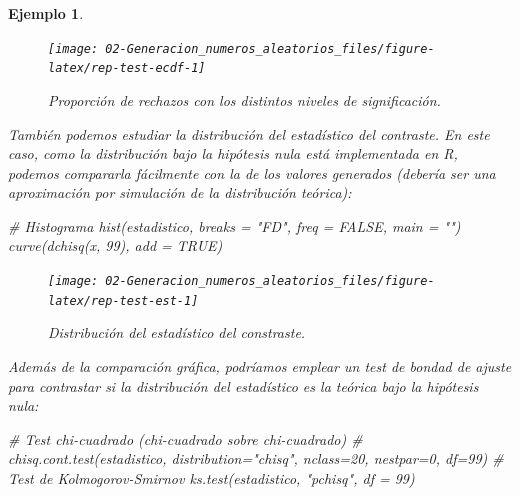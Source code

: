 \documentclass[
]{book}
\newenvironment{Shaded}{\begin{snugshade}}{\end{snugshade}}
\newcommand{\AttributeTok}[1]{\textcolor[rgb]{0.77,0.63,0.00}{#1}}
\newcommand{\CommentTok}[1]{\textcolor[rgb]{0.56,0.35,0.01}{\textit{#1}}}
\newcommand{\ConstantTok}[1]{\textcolor[rgb]{0.00,0.00,0.00}{#1}}
\newcommand{\DecValTok}[1]{\textcolor[rgb]{0.00,0.00,0.81}{#1}}
\newcommand{\FunctionTok}[1]{\textcolor[rgb]{0.00,0.00,0.00}{#1}}
\newcommand{\NormalTok}[1]{#1}
\newcommand{\StringTok}[1]{\textcolor[rgb]{0.31,0.60,0.02}{#1}}
\theoremstyle{break}
\newtheorem{example}{Ejemplo}[chapter]
\theoremstyle{nonumberplain}
\begin{document}
\begin{example}
\begin{figure}[!htb]

{\centering \texttt{[image: 02-Generacion\_numeros\_aleatorios\_files/figure-latex/rep-test-ecdf-1]} 

}

\caption{Proporción de rechazos con los distintos niveles de significación.}\label{fig:rep-test-ecdf}
\end{figure}

También podemos estudiar la distribución del estadístico del contraste.
En este caso, como la distribución bajo la hipótesis nula está implementada en R, podemos compararla fácilmente con la de los valores generados (debería ser una aproximación por simulación de la distribución teórica):

\begin{Shaded}
\begin{Highlighting}[]
\CommentTok{\# Histograma}
\FunctionTok{hist}\NormalTok{(estadistico, }\AttributeTok{breaks =} \StringTok{"FD"}\NormalTok{, }\AttributeTok{freq =} \ConstantTok{FALSE}\NormalTok{, }\AttributeTok{main =} \StringTok{""}\NormalTok{)}
\FunctionTok{curve}\NormalTok{(}\FunctionTok{dchisq}\NormalTok{(x, }\DecValTok{99}\NormalTok{), }\AttributeTok{add =} \ConstantTok{TRUE}\NormalTok{)}
\end{Highlighting}
\end{Shaded}

\begin{figure}[!htb]

{\centering \texttt{[image: 02-Generacion\_numeros\_aleatorios\_files/figure-latex/rep-test-est-1]} 

}

\caption{Distribución del estadístico del constraste.}\label{fig:rep-test-est}
\end{figure}

Además de la comparación gráfica, podríamos emplear un test de bondad de ajuste para contrastar si la distribución del estadístico es la teórica bajo la hipótesis nula:

\begin{Shaded}
\begin{Highlighting}[]
\CommentTok{\# Test chi{-}cuadrado (chi{-}cuadrado sobre chi{-}cuadrado)}
\CommentTok{\# chisq.cont.test(estadistico, distribution="chisq", nclass=20, nestpar=0, df=99)}
\CommentTok{\# Test de Kolmogorov{-}Smirnov}
\FunctionTok{ks.test}\NormalTok{(estadistico, }\StringTok{"pchisq"}\NormalTok{, }\AttributeTok{df =} \DecValTok{99}\NormalTok{)}
\end{Highlighting}
\end{Shaded}


\end{example}
\end{document}

